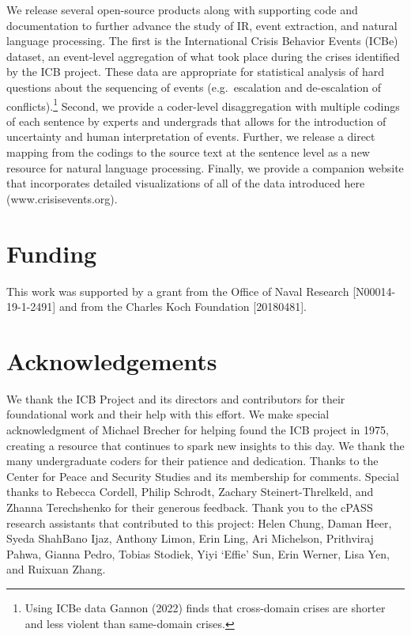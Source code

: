 \documentclass{article}
\begin{document}
We release several open-source products along with supporting code and
documentation to further advance the study of IR, event extraction, and
natural language processing. The first is the International Crisis
Behavior Events (ICBe) dataset, an event-level aggregation of what took
place during the crises identified by the ICB project. These data are
appropriate for statistical analysis of hard questions about the
sequencing of events (e.g.~escalation and de-escalation of
conflicts).\footnote{Using ICBe data Gannon (2022) finds that
  cross-domain crises are shorter and less violent than same-domain
  crises.} Second, we provide a coder-level disaggregation with multiple
codings of each sentence by experts and undergrads that allows for the
introduction of uncertainty and human interpretation of events. Further,
we release a direct mapping from the codings to the source text at the
sentence level as a new resource for natural language processing.
Finally, we provide a companion website that incorporates detailed
visualizations of all of the data introduced here
(www.crisisevents.org).

\hypertarget{funding}{%
\section{Funding}\label{funding}}

This work was supported by a grant from the Office of Naval Research
{[}N00014-19-1-2491{]} and from the Charles Koch Foundation
{[}20180481{]}.

\hypertarget{acknowledgements}{%
\section{Acknowledgements}\label{acknowledgements}}

We thank the ICB Project and its directors and contributors for their
foundational work and their help with this effort. We make special
acknowledgment of Michael Brecher for helping found the ICB project in
1975, creating a resource that continues to spark new insights to this
day. We thank the many undergraduate coders for their patience and
dedication. Thanks to the Center for Peace and Security Studies and its
membership for comments. Special thanks to Rebecca Cordell, Philip
Schrodt, Zachary Steinert-Threlkeld, and Zhanna Terechshenko for their
generous feedback. Thank you to the cPASS research assistants that
contributed to this project: Helen Chung, Daman Heer, Syeda ShahBano
Ijaz, Anthony Limon, Erin Ling, Ari Michelson, Prithviraj Pahwa, Gianna
Pedro, Tobias Stodiek, Yiyi `Effie' Sun, Erin Werner, Lisa Yen, and
Ruixuan Zhang.
\end{document}
